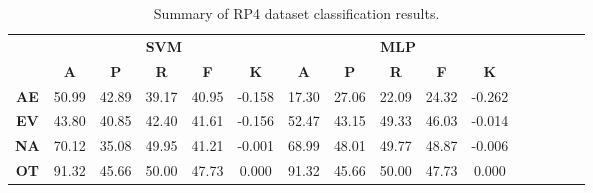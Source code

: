 \begin{landscape}
\begin{table}[htbp]
\footnotesize
\centering
\caption{Summary of RP4 dataset classification results.}
\label{tab:base_female}
\begin{tabular}{|c|c|c|c|c|c|c|c|c|c|c|c|c|c|c|c|}
\hline
\multirow{2}{*}{}	& \multicolumn{5}{c|}{\textbf{SVM}}												& \multicolumn{5}{c|}{\textbf{MLP}}												\\ \cline{2-11} 
					& \textbf{A}	& \textbf{P}	& \textbf{R}	& \textbf{F}	& \textbf{K}	& \textbf{A}	& \textbf{P}	& \textbf{R}	& \textbf{F}	& \textbf{K}	\\ \hline
\textbf{AE}			& 50.99			& 42.89			& 39.17			& 40.95			& -0.158			& 17.30			& 27.06			& 22.09			& 24.32			& -0.262			\\ \hline
\textbf{EV}			& 43.80			& 40.85			& 42.40			& 41.61			& -0.156			& 52.47			& 43.15			& 49.33			& 46.03			& -0.014			\\ \hline
\textbf{NA}			& 70.12			& 35.08			& 49.95			& 41.21			& -0.001			& 68.99			& 48.01			& 49.77			& 48.87			& -0.006			\\ \hline
\textbf{OT}			& 91.32			& 45.66			& 50.00			& 47.73			& 0.000			& 91.32			& 45.66			& 50.00			& 47.73			& 0.000			\\ \hline
\end{tabular}
\end{table}
\end{landscape}